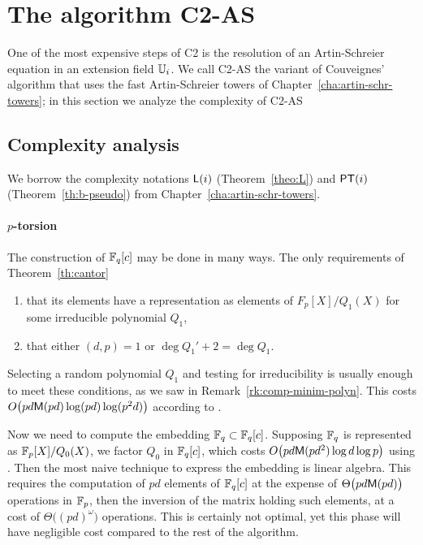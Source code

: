 \section{The algorithm C2-AS}
\label{sec:C2-AS}

One of the most expensive steps of C2 is the resolution of an
Artin-Schreier equation in an extension field $\mathbb{U}_i$. We call C2-AS
the variant of Couveignes' algorithm that uses the fast Artin-Schreier
towers of Chapter~\ref{cha:artin-schr-towers}; in this section we
analyze the complexity of C2-AS

\subsection{Complexity analysis}
\label{sec:C2-AS:complexity}
We borrow the complexity notations $\mathsf{L}(i)$ (Theorem~\ref{theo:L})
and $\mathsf{PT}(i)$ (Theorem~\ref{th:b-pseudo}) from
Chapter~\ref{cha:artin-schr-towers}.

\paragraph{$p$-torsion}
The construction of $\mathbb{F}_q[c]$ may be done in many ways. The only
requirements of Theorem~\ref{th:cantor}
\begin{enumerate}
\item that its elements have a representation as elements of
  $F_p[X]/Q_1(X)$ for some irreducible polynomial $Q_1$,
\item that either $(d,p)=1$ or $\deg Q_1' + 2 = \deg Q_1$.
\end{enumerate}
Selecting a random polynomial $Q_1$ and testing for irreducibility is
usually enough to meet these conditions, as we saw in
Remark~\ref{rk:comp-minim-polyn}.  This costs $O\bigl(pd\mathsf{M}(pd)\log
(pd)\log(p^2d)\bigr)$ according to \cite[Th.  14.42]{vzGG}.

Now we need to compute the embedding $\mathbb{F}_q\subset\mathbb{F}_q[c]$. Supposing
$\mathbb{F}_q$ is represented as $\mathbb{F}_p[X]/Q_0(X)$, we factor $Q_0$ in
$\mathbb{F}_q[c]$, which costs $O\bigl(pd\mathsf{M}(pd^2)\log d\log p\bigr)$ using
\cite[Coro. 14.16]{vzGG}. Then the most naive technique to express the
embedding is linear algebra. This requires the computation of $pd$
elements of $\mathbb{F}_q[c]$ at the expense of $\Theta\bigl(pd\mathsf{M}(pd)\bigr)$
operations in $\mathbb{F}_p$, then the inversion of the matrix holding such
elements, at a cost of $\Theta\bigl((pd)^\omega\bigr)$ operations. This is
certainly not optimal, yet this phase will have negligible cost
compared to the rest of the algorithm.

